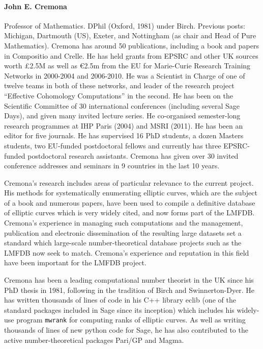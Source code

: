 \paragraph{John E. Cremona}
Professor of Mathematics.  DPhil (Oxford, 1981) under Birch.  Previous
posts: Michigan, Dartmouth (US), Exeter, and Nottingham (as chair and
Head of Pure Mathematics). Cremona has around 50 publications,
including a book and papers in Compositio and Crelle.  He has held
grants from EPSRC and other UK sources worth \pounds2.5M as well as
\euro2.5m from the EU for Marie-Curie Research Training Networks in
2000-2004 and 2006-2010.  He was a Scientist in Charge of one of
twelve teams in both of these networks, and leader of the research
project ``Effective Cohomology Computations'' in the second.  He has
been on the Scientific Committee of 30 international conferences
(including several Sage Days), and given many invited lecture series.
He co-organised semester-long research programmes at IHP Paris (2004)
and MSRI (2011).  He has been an editor for five journals.  He has
supervised 16 PhD students, a dozen Masters students, two EU-funded
postdoctoral fellows and currently has three EPSRC-funded postdoctoral
research assistants.  Cremona has given over 30 invited conference
addresses and seminars in 9 countries in the last 10 years.

Cremona's research includes areas of particular relevance to the
current project.  His methods for systematically enumerating elliptic
curves, which are the subject of a book and numerous papers, have been
used to compile a definitive database of elliptic curves which is very
widely cited, and now forms part of the LMFDB.  Cremona's experience
in managing such computations and the management, publication and
electronic dissemination of the resulting large datasets set a
standard which large-scale number-theoretical database projects such
as the LMFDB now seek to match.  Cremona's experience and reputation
in this field have been important for the LMFDB project.

Cremona has been a leading computational number theorist in the UK
since his PhD thesis in 1981, following in the tradition of Birch and
Swinnerton-Dyer.  He has written thousands of lines of code in his C++
library eclib (one of the standard packages included in Sage since its
inception) which includes his widely-use program {\tt mwrank} for
computing ranks of elliptic curves.  As well as writing thousands of
lines of new python code for Sage, he has also contributed to the
active number-theoretical packages Pari/GP and Magma.
